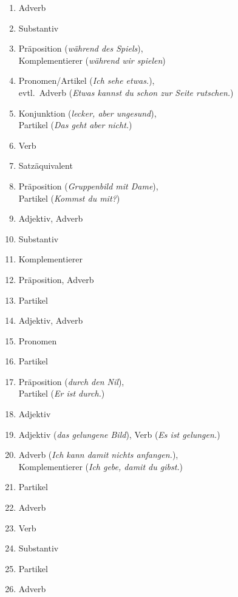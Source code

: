 \begin{enumerate}\Lf
  \item Adverb
  \item Substantiv
  \item Präposition (\textit{während des Spiels}),\\
    Komplementierer (\textit{während wir spielen})
  \item Pronomen\slash Artikel (\textit{Ich sehe etwas.}),\\
    evtl.\ Adverb (\textit{Etwas kannst du schon zur Seite rutschen.})
  \item Konjunktion (\textit{lecker, aber ungesund}),\\
    Partikel (\textit{Das geht aber nicht.})
  \item Verb
  \item Satzäquivalent
  \item Präposition (\textit{Gruppenbild mit Dame}),\\
    Partikel (\textit{Kommst du mit?})
  \item Adjektiv, Adverb
  \item Substantiv
  \item Komplementierer
  \item Präposition, Adverb
  \item Partikel
  \item Adjektiv, Adverb
  \item Pronomen
  \item Partikel
  \item Präposition (\textit{durch den Nil}),\\
    Partikel (\textit{Er ist durch.})
  \item Adjektiv
  \item Adjektiv (\textit{das gelungene Bild}), Verb (\textit{Es ist gelungen.})
  \item Adverb (\textit{Ich kann damit nichts anfangen.}),\\
    Komplementierer (\textit{Ich gebe, damit du gibst.})
  \item Partikel
  \item Adverb
  \item Verb
  \item Substantiv
  \item Partikel
  \item Adverb
\end{enumerate}




